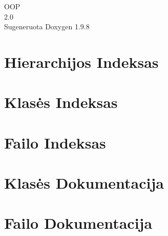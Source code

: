 \documentclass[twoside]{book}
\newcommand{\+}{\discretionary{\mbox{\scriptsize$\hookleftarrow$}}{}{}}
\newcommand{\clearemptydoublepage}{%
    \newpage{\pagestyle{empty}\cleardoublepage}%
  }
\begin{document}
  \raggedbottom
    \hypersetup{pageanchor=false,
                bookmarksnumbered=true,
                pdfencoding=unicode
               }
  \begin{titlepage}
  \vspace*{7cm}
  \begin{center}%
  {\Large OOP}\\
  [1ex]\large 2.\+0 \\
  \vspace*{1cm}
  {\large Sugeneruota Doxygen 1.9.8}\\
  \end{center}
  \end{titlepage}
  \clearemptydoublepage
  \tableofcontents
  \clearemptydoublepage
  \hypersetup{pageanchor=true}
\chapter{Hierarchijos Indeksas}

\chapter{Klasės Indeksas}

\chapter{Failo Indeksas}

\chapter{Klasės Dokumentacija}


\chapter{Failo Dokumentacija}








  \backmatter
  \newpage
  \clearemptydoublepage
  \printindex
\end{document}
